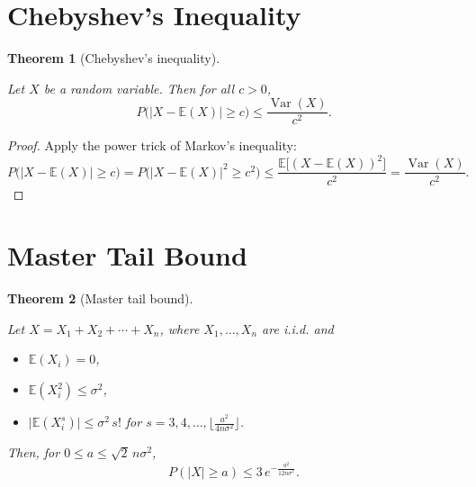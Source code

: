 \documentclass[
  letterpaper,
  DIV=11,
  numbers=noendperiod]{scrreprt}
\providecommand{\tightlist}{%
  \setlength{\itemsep}{0pt}\setlength{\parskip}{0pt}}
\theoremstyle{definition}
\theoremstyle{plain}
\newtheorem{theorem}{Theorem}[chapter]
\theoremstyle{plain}
\theoremstyle{definition}
\theoremstyle{plain}
\theoremstyle{plain}
\theoremstyle{remark}
\begin{document}
\section{Chebyshev's Inequality}\label{chebyshevs-inequality}

\begin{theorem}[Chebyshev's
inequality]\protect\hypertarget{thm-chebyshev}{}\label{thm-chebyshev}

Let \(X\) be a random variable. Then for all \(c > 0\), \[
P\big(|X - \mathbb{E}(X)| \ge c\big) \le \frac{\operatorname{Var}(X)}{c^2}.
\]

\end{theorem}

\begin{proof}
Apply the power trick of Markov's inequality: \[
P\big(|X - \mathbb{E}(X)| \ge c\big)
= P\big(|X - \mathbb{E}(X)|^2 \ge c^2\big)
\le \frac{\mathbb{E}\big[(X - \mathbb{E}(X))^2\big]}{c^2}
= \frac{\operatorname{Var}(X)}{c^2}.
\]
\end{proof}

\section{Master Tail Bound}\label{master-tail-bound}

\begin{theorem}[Master tail
bound]\protect\hypertarget{thm-master-tail}{}\label{thm-master-tail}

Let \(X = X_1 + X_2 + \cdots + X_n\), where \(X_1, \dots, X_n\) are
i.i.d. and

\begin{itemize}
\tightlist
\item
  \(\mathbb{E}(X_i) = 0\),
\item
  \(\mathbb{E}(X_i^2) \le \sigma^2\),
\item
  \(\big|\mathbb{E}(X_i^s)\big| \le \sigma^2\, s!\) for
  \(s = 3, 4, \dots, \big\lfloor \tfrac{a^2}{4n\sigma^2}\big\rfloor\).
\end{itemize}

Then, for \(0 \le a \le \sqrt{2}\, n\sigma^2\), \[
P(|X| \ge a) \le 3\, e^{-\frac{a^2}{12 n \sigma^2}}.
\]

\end{theorem}
\end{document}
